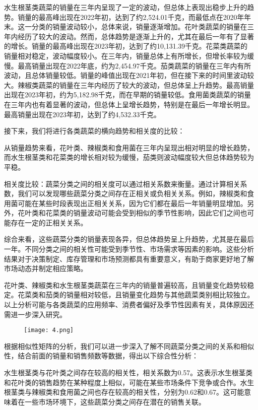 \documentclass[withoutpreface,bwprint]{cumcmthesis} %
\begin{document}
	水生根茎类蔬菜的销量在三年内呈现了一定的波动，但总体上表现出稳步上升的趋势。销量的最高峰出现在2022年初，达到了约2,524.01千克，而最低点在2020年年末。这一分类的销量波动较小，总体来说，销量逐渐增加。花叶类蔬菜的销量在三年内经历了较大的波动。然而，总体趋势是逐渐上升的，尤其在最后一年有了显著的增长。销量的最高峰出现在2023年初，达到了约10,131.39千克。花菜类蔬菜的销量相对稳定，波动幅度较小。在三年内，销量总体上有所增长，但增长率较为缓慢。最高销量出现在2022年底，约为2,454.97千克。茄类蔬菜的销量在三年内有所波动，且总体销量较低。销量的峰值出现在2021年初，但在接下来的时间里波动较大。辣椒类蔬菜的销量在三年内经历了较大的波动，但总体呈上升趋势。最高销量出现在2023年初，约为5,182.98千克，而在早期的销量较低。食用菌类蔬菜的销量在三年内也有着显著的波动，但总体上呈增长趋势，特别是在最后一年增长明显。最高销量出现在2023年初，达到了约4,532.33千克。
	
	接下来，我们将进行各类蔬菜的横向趋势和相关度的比较：
	
	从销量趋势来看，花叶类、辣椒类和食用菌在三年内呈现出相对明显的增长趋势，而水生根茎类和花菜类的增长相对较为缓慢，茄类则波动幅度较大但总体趋势较为平稳。
	
	相关度比较：蔬菜分类之间的相关度可以通过相关系数来衡量。通过计算相关系数，我们可以发现哪些蔬菜分类之间存在正相关或负相关关系。例如，辣椒类和食用菌可能在某些时段表现出正相关关系，因为它们都在最后一年销量明显增加。另外，花叶类和花菜类的销量波动可能会受到相似的季节性影响，因此它们之间也可能存在一定的正相关关系。
	
	综合来看，这些蔬菜分类的销量表现各异，但总体趋势呈上升趋势，尤其是在最后一年。不同分类之间的相关性可能受到季节性、市场需求等因素的影响。这些分析结果对于决策制定、库存管理和市场预测都具有重要意义，有助于商家更好地了解市场动态并制定相应策略。
	
	花叶类、辣椒类和水生根茎类蔬菜在三年内的销量普遍较高，且销量变化趋势较稳定。花菜类和茄类的销量相对较低，且销量变化趋势与其他蔬菜类别相比较独立。以上分析可能与各类蔬菜的应用频率、消费者偏好及季节性因素有关，具体原因还需进一步深入研究。
		\begin{figure}[H]
		\centering
		\texttt{[image: 4.png]}
	\end{figure}
	根据相似性矩阵的分析，我们可以进一步深入了解不同蔬菜分类之间的关系和相似性，结合前面的销量和销售频数等数据，得出以下综合性分析：
	
	水生根茎类与花叶类之间存在较高的相关性，相关系数为0.57。这表示水生根茎类和花叶类的销售趋势在某种程度上相似，可能在某些市场条件下竞争或合作。水生根茎类与辣椒类和食用菌之间也存在较高的相关性，分别为0.62和0.67。这可能意味着在一些市场环境下，这些蔬菜分类之间存在潜在的销售关联。
	
\end{document}
